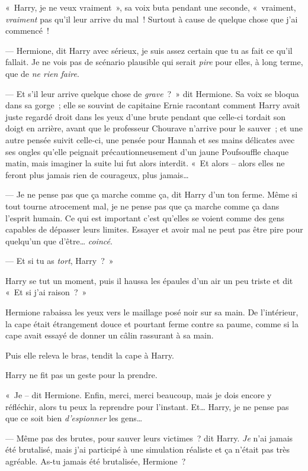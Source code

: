 «~Harry, je ne veux vraiment~», sa voix buta pendant une seconde, «~vraiment, \emph{vraiment} pas qu'il leur arrive du mal~!
Surtout à cause de quelque chose que j'ai commencé~!

--- Hermione, dit Harry avec sérieux, je suis assez certain que tu as fait ce qu'il fallait.
Je ne vois pas de scénario plausible qui serait \emph{pire} pour elles, à long terme, que de \emph{ne rien faire}.

--- Et s'il leur arrive quelque chose de \emph{grave}~?~»
dit Hermione.
Sa voix se bloqua dans sa gorge~; elle se souvint de capitaine Ernie racontant comment Harry avait juste regardé droit dans les yeux d'une brute pendant que celle-ci tordait son doigt en arrière, avant que le professeur Chourave n'arrive pour le sauver~; et une autre pensée suivit celle-ci, une pensée pour Hannah et ses mains délicates avec ses ongles qu'elle peignait précautionneusement d'un jaune Poufsouffle chaque matin, mais imaginer la suite lui fut alors interdit.
«~Et alors -- alors elles ne feront plus jamais rien de courageux, plus jamais…

--- Je ne pense pas que ça marche comme ça, dit Harry d'un ton ferme.
Même si tout tourne atrocement mal, je ne pense pas que ça marche comme ça dans l'esprit humain.
Ce qui est important c'est qu'elles se voient comme des gens capables de dépasser leurs limites.
Essayer et avoir mal ne peut pas être pire pour quelqu'un que d'être…
\emph{coincé}.

--- Et si tu as \emph{tort}, Harry~?~»

Harry se tut un moment, puis il haussa les épaules d'un air un peu triste et dit «~Et si j'ai raison~?~»

Hermione rabaissa les yeux vers le maillage posé noir sur sa main.
De l'intérieur, la cape était étrangement douce et pourtant ferme contre sa paume, comme si la cape avait essayé de donner un câlin rassurant à sa main.

Puis elle releva le bras, tendit la cape à Harry.

Harry ne fit pas un geste pour la prendre.

«~Je -- dit Hermione.
Enfin, merci, merci beaucoup, mais je dois encore y réfléchir, alors tu peux la reprendre pour l'instant.
Et… Harry, je ne pense pas que ce soit bien \emph{d'espionner} les gens…

--- Même pas des brutes, pour sauver leurs victimes~? dit Harry.
\emph{Je} n'ai jamais été brutalisé, mais j'ai participé à une simulation réaliste et ça n'était pas très agréable.
As-tu jamais été brutalisée, Hermione~?

